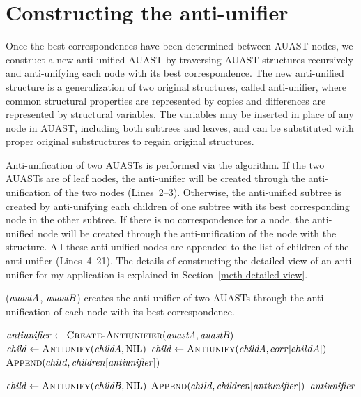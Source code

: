 \section{Constructing the anti-unifier} \label{meth-antiUnifier}
Once the best correspondences have been determined between AUAST nodes, we construct a new anti-unified AUAST by traversing AUAST structures recursively and anti-unifying each node with its best correspondence. The new anti-unified structure is a generalization of two original structures, called anti-unifier, where common structural properties are represented by copies and differences are represented by structural variables. The variables may be inserted in place of any node in AUAST, including both subtrees and leaves, and can be substituted with proper original substructures to regain original structures. 


Anti-unification of two AUASTs is performed via the  algorithm.
If the two AUASTs are of leaf nodes, the anti-unifier will be created through the anti-unification of the two nodes (Lines~2--3). Otherwise, the anti-unified subtree is created by anti-unifying each children of one subtree with its best corresponding node in the other subtree. If there is no correspondence for a node, the anti-unified node will be created through the anti-unification of the node with the \NIL{} structure. All these anti-unified nodes are appended to the list of children of the anti-unifier (Lines~4--21). The details of constructing the detailed view of an anti-unifier for my application is explained in Section~\ref{meth-detailed-view}. 


\begin{algorithm}
 \caption{($\mathit{auastA}$, $\mathit{auastB}$) creates the anti-unifier of two AUASTs through the anti-unification of each node with its best correspondence.}
  \label{AntiUnify}
  \begin{algorithmic}[1]
\AntiUnify
{}
  \State $\mathit{antiunifier} \gets   \textsc{Create-Antiunifier}(\mathit{auastA},\mathit{auastB})$
  \State $\mathit{child} \gets   \textsc{Antiunify}(\mathit{childA},\textrm{NIL})$
\Else	
 \State $\mathit{child} \gets   \textsc{Antiunify}(\mathit{childA},corr[childA])$
\EndIf 
\State $\textsc{Append}(child,\mathit{children[antiunifier]})$
\EndFor
	\EndIf	
 
  \State $\mathit{child} \gets   \textsc{Antiunify}(\mathit{childB},\textrm{NIL})$
\EndIf 
\State $\textsc{Append}(child,\mathit{children[antiunifier]})$
\EndFor
  \EndIf
\Return $\mathit{antiunifier}$
\end{algorithmic}
\end{algorithm}



